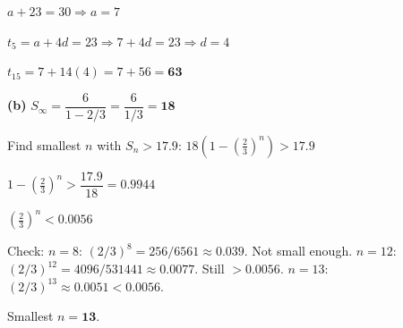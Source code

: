 \documentclass[addpoints]{exam}
\begin{document}
\begin{questions}
\begin{solution}[9cm]
$a + 23 = 30 \Rightarrow a = 7$

$t_5 = a + 4d = 23 \Rightarrow 7 + 4d = 23 \Rightarrow d = 4$

$t_{15} = 7 + 14(4) = 7 + 56 = \mathbf{63}$

\textbf{(b)} $S_\infty = \dfrac{6}{1-2/3} = \dfrac{6}{1/3} = \mathbf{18}$

Find smallest $n$ with $S_n > 17.9$:
$18\!\left(1 - \left(\tfrac{2}{3}\right)^n\right) > 17.9$

$1 - \left(\tfrac{2}{3}\right)^n > \dfrac{17.9}{18} = 0.9944$

$\left(\tfrac{2}{3}\right)^n < 0.0056$

Check: $n=8$: $(2/3)^8 = 256/6561 \approx 0.039$. Not small enough.
$n=12$: $(2/3)^{12} = 4096/531441 \approx 0.0077$. Still $> 0.0056$.
$n=13$: $(2/3)^{13} \approx 0.0051 < 0.0056$. \checkmark

Smallest $n = \mathbf{13}$.
\end{solution}

\end{questions}
\end{document}
